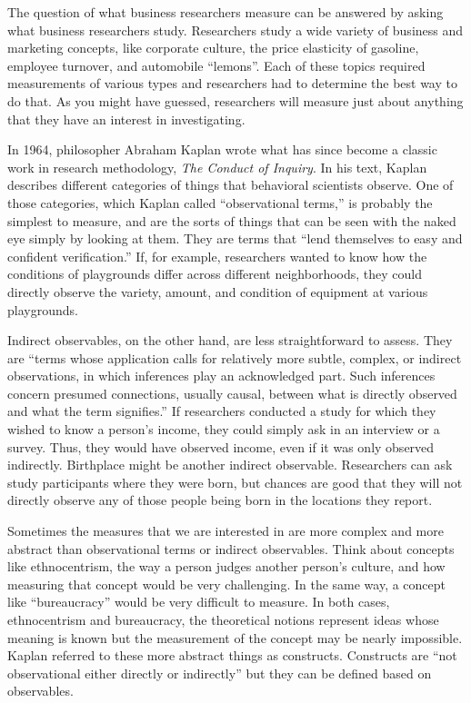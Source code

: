 The question of what business researchers measure can be answered by asking what business researchers study. Researchers study a wide variety of business and marketing concepts, like corporate culture\cite{denison1990corporate}, the price elasticity of gasoline\cite{hughes2006evidence}, employee turnover\cite{hom1995employee}, and automobile ``lemons''\cite{akerlof1978market}. Each of these topics required measurements of various types and researchers had to determine the best way to do that. As you might have guessed, researchers will measure just about anything that they have an interest in investigating. 

In 1964, philosopher Abraham Kaplan wrote what has since become a classic work in research methodology, \textit{The Conduct of Inquiry}\cite{kaplan2017conduct}. In his text, Kaplan describes different categories of things that behavioral scientists observe. One of those categories, which Kaplan called ``observational terms,'' is probably the simplest to measure, and are the sorts of things that can be seen with the naked eye simply by looking at them. They are terms that ``lend themselves to easy and confident verification.'' If, for example, researchers wanted to know how the conditions of playgrounds differ across different neighborhoods, they could directly observe the variety, amount, and condition of equipment at various playgrounds.

Indirect observables, on the other hand, are less straightforward to assess. They are ``terms whose application calls for relatively more subtle, complex, or indirect observations, in which inferences play an acknowledged part. Such inferences concern presumed connections, usually causal, between what is directly observed and what the term signifies.'' If researchers conducted a study for which they wished to know a person's income, they could simply ask in an interview or a survey. Thus, they would have observed income, even if it was only observed indirectly. Birthplace might be another indirect observable. Researchers can ask study participants where they were born, but chances are good that they will not directly observe any of those people being born in the locations they report.

Sometimes the measures that we are interested in are more complex and more abstract than observational terms or indirect observables. Think about concepts like ethnocentrism, the way a person judges another person's culture, and how measuring that concept would be very challenging. In the same way, a concept like  ``bureaucracy'' would be very difficult to measure. In both cases, ethnocentrism and bureaucracy, the theoretical notions represent ideas whose meaning is known but the measurement of the concept may be nearly impossible. Kaplan referred to these more abstract things as \glspl{construct}. Constructs are ``not observational either directly or indirectly'' but they can be defined based on observables.

